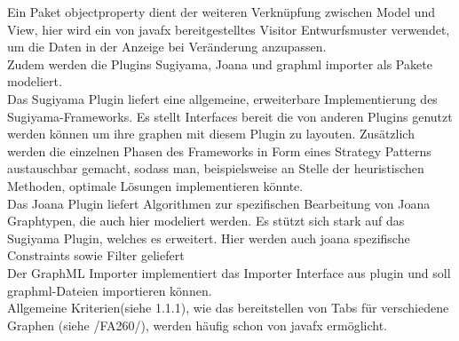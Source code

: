 Ein Paket objectproperty dient der weiteren Verknüpfung zwischen Model und View, hier wird ein von javafx bereitgestelltes Visitor Entwurfsmuster verwendet, um die Daten in der Anzeige bei Veränderung anzupassen.\\
Zudem werden die Plugins Sugiyama, Joana und graphml importer als Pakete modeliert.\\
Das Sugiyama Plugin liefert eine allgemeine, erweiterbare Implementierung des Sugiyama-Frameworks. Es stellt Interfaces bereit die von anderen Plugins genutzt werden können um ihre graphen mit diesem Plugin zu layouten. Zusätzlich werden die einzelnen Phasen des Frameworks in Form eines Strategy Patterns austauschbar gemacht, sodass man, beispielsweise an Stelle der heuristischen Methoden, optimale Lösungen implementieren könnte.\\
Das Joana Plugin liefert Algorithmen zur spezifischen Bearbeitung von Joana Graphtypen, die auch hier modeliert werden. Es stützt sich stark auf das Sugiyama Plugin, welches es erweitert. Hier werden auch joana spezifische Constraints sowie Filter geliefert\\
Der GraphML Importer implementiert das Importer Interface aus plugin und soll graphml-Dateien importieren können.\\
Allgemeine Kriterien(siehe 1.1.1), wie das bereitstellen von Tabs für verschiedene Graphen (siehe /FA260/), werden häufig schon von javafx ermöglicht.
